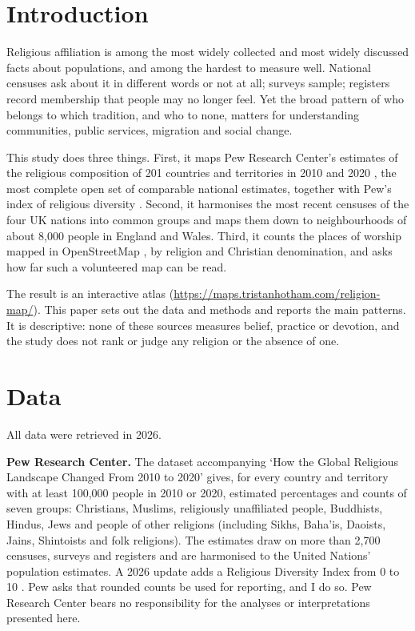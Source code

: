 \documentclass[11pt,a4paper]{article}
\begin{document}
\section{Introduction}
Religious affiliation is among the most widely collected and most widely discussed facts about populations, and among the hardest to measure well. National censuses ask about it in different words or not at all; surveys sample; registers record membership that people may no longer feel. Yet the broad pattern of who belongs to which tradition, and who to none, matters for understanding communities, public services, migration and social change.

This study does three things. First, it maps Pew Research Center's estimates of the religious composition of 201 countries and territories in 2010 and 2020 \citep{pew2025}, the most complete open set of comparable national estimates, together with Pew's index of religious diversity \citep{pew2026}. Second, it harmonises the most recent censuses of the four UK nations \citep{ons2021,ons2011,nrs2022,nisra2021} into common groups and maps them down to neighbourhoods of about 8,000 people in England and Wales. Third, it counts the places of worship mapped in OpenStreetMap \citep{osm}, by religion and Christian denomination, and asks how far such a volunteered map can be read.

The result is an interactive atlas (\url{https://maps.tristanhotham.com/religion-map/}). This paper sets out the data and methods and reports the main patterns. It is descriptive: none of these sources measures belief, practice or devotion, and the study does not rank or judge any religion or the absence of one.

\section{Data}
All data were retrieved in 2026.

\textbf{Pew Research Center.} The dataset accompanying `How the Global Religious Landscape Changed From 2010 to 2020' \citep{pew2025} gives, for every country and territory with at least 100,000 people in 2010 or 2020, estimated percentages and counts of seven groups: Christians, Muslims, religiously unaffiliated people, Buddhists, Hindus, Jews and people of other religions (including Sikhs, Baha'is, Daoists, Jains, Shintoists and folk religions). The estimates draw on more than 2,700 censuses, surveys and registers and are harmonised to the United Nations' population estimates. A 2026 update adds a Religious Diversity Index from 0 to 10 \citep{pew2026}. Pew asks that rounded counts be used for reporting, and I do so. Pew Research Center bears no responsibility for the analyses or interpretations presented here.
\end{document}
